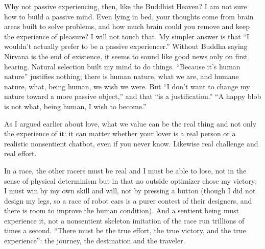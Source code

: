 Why not passive experiencing, then, like the Buddhist Heaven? I am not sure how to build a passive mind. Even lying in bed, your thoughts come from brain areas built to solve problems, and how much brain could you remove and keep the experience of pleasure? I will not touch that. My simpler answer is that ``I wouldn't actually prefer to be a passive experiencer.'' Without Buddha saying Nirvana is the end of existence, it seems to sound like good news only on first hearing. Natural selection built my mind to do things. ``Because it's human nature'' justifies nothing; there is human nature, what we are, and humane nature, what, being human, we wish we were. But ``I don't want to change my nature toward a more passive object,'' and that ``is a justification.'' ``A happy blob is not what, being human, I wish to become.'' 

As I argued earlier about love, what we value can be the real thing and not only the experience of it: it can matter whether your lover is a real person or a realistic nonsentient chatbot, even if you never know. Likewise real challenge and real effort.

In a race, the other racers must be real and I must be able to lose, not in the sense of physical determinism but in that no outside optimizer chose my victory; I must win by my own skill and will, not by pressing a button (though I did not design my legs, so a race of robot cars is a purer contest of their designers, and there is room to improve the human condition). And a sentient being must experience it, not a nonsentient skeleton imitation of the race run trillions of times a second. ``There must be the true effort, the true victory, and the true experience'': the journey, the destination and the traveler.
